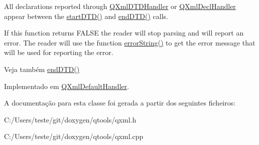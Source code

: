 All declarations reported through \hyperlink{class_q_xml_d_t_d_handler}{Q\-Xml\-D\-T\-D\-Handler} or \hyperlink{class_q_xml_decl_handler}{Q\-Xml\-Decl\-Handler} appear between the \hyperlink{class_q_xml_lexical_handler_a2ea9d9ea737aebf275346d81eea3e2b7}{start\-D\-T\-D()} and \hyperlink{class_q_xml_lexical_handler_a418bba370ca7d74563c7e66c55c54631}{end\-D\-T\-D()} calls.

If this function returns F\-A\-L\-S\-E the reader will stop parsing and will report an error. The reader will use the function \hyperlink{class_q_xml_lexical_handler_ac86bbbabef3a52aec7615cbbc0adb3f4}{error\-String()} to get the error message that will be used for reporting the error.

\begin{DoxySeeAlso}{Veja também}
\hyperlink{class_q_xml_lexical_handler_a418bba370ca7d74563c7e66c55c54631}{end\-D\-T\-D()} 
\end{DoxySeeAlso}


Implementado em \hyperlink{class_q_xml_default_handler_a4e6d659ffbcf1382f9ac908f987512ae}{Q\-Xml\-Default\-Handler}.



A documentação para esta classe foi gerada a partir dos seguintes ficheiros\-:\begin{DoxyCompactItemize}
\item 
C\-:/\-Users/teste/git/doxygen/qtools/qxml.\-h\item 
C\-:/\-Users/teste/git/doxygen/qtools/qxml.\-cpp\end{DoxyCompactItemize}
